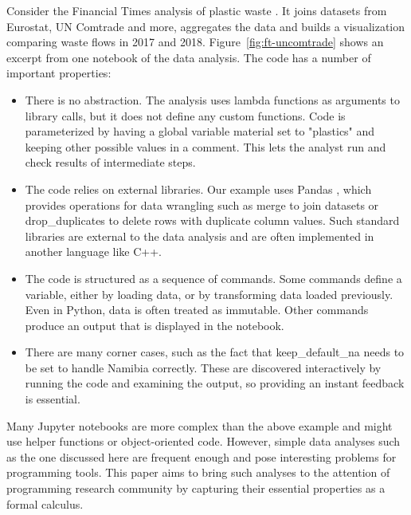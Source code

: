 \documentclass[english,submission]{programming}
\theoremstyle{plain}
\theoremstyle{definition}
\newcommand{\str}[1]{\textnormal{\textcolor{strclr}{\sffamily "#1"}}}
\newcommand{\ident}[1]{\textnormal{\textcolor{idclr}{\sffamily #1}}}
\begin{document}
Consider the Financial Times analysis of plastic waste \cite{ftnotebooks,ftarticle}. It joins
datasets from Eurostat, UN Comtrade and more, aggregates the data and
builds a visualization comparing waste flows in 2017 and 2018. Figure~\ref{fig:ft-uncomtrade} shows
an excerpt from one notebook of the data analysis. The code has a number of important properties:
%
\begin{itemize}
\item There is no abstraction. The analysis uses lambda functions as arguments to library calls,
  but it does not define any custom functions. Code is parameterized by having a global variable
  \ident{material} set to \str{plastics} and keeping other possible values in a comment.
  This lets the analyst run and check results of intermediate steps.

\item The code relies on external libraries. Our example uses Pandas \cite{pandas},
  which provides operations for data wrangling such as \ident{merge} to join datasets
  or \ident{drop\_duplicates} to delete rows with duplicate column values. Such standard libraries
  are external to the data analysis and are often implemented in another language like C++.

\item The code is structured as a sequence of commands. Some commands define a variable, either by
  loading data, or by transforming data loaded previously. Even in Python, data is often treated
  as immutable. Other commands produce an output that is displayed in the notebook.

\item There are many corner cases, such as the fact that \ident{keep\_default\_na}
  needs to be set to handle Namibia correctly. These are discovered interactively by
  running the code and examining the output, so providing an instant feedback is essential.
\end{itemize}

\noindent
Many Jupyter notebooks are more complex than the above example and might use helper
functions or object-oriented code. However, simple data analyses such as the one discussed
here are frequent enough and pose interesting problems for programming tools.
This paper aims to bring such analyses to the attention of programming research community
by capturing their essential properties as a formal calculus.

\end{document}
